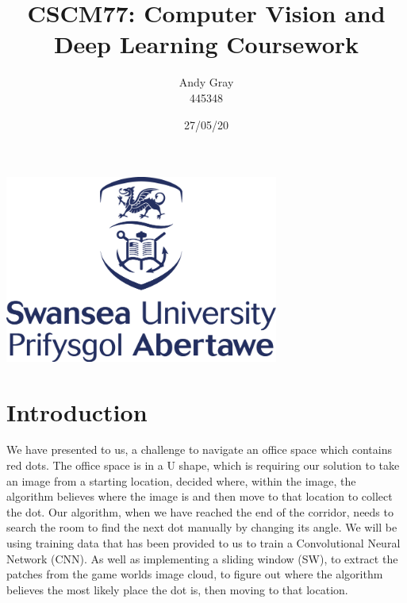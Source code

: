 \documentclass[a4paper,10pt]{article}
\begin{document}
\title{\textbf{CSCM77: Computer Vision and Deep Learning Coursework}}
\date{27/05/20}
\author{Andy Gray\\445348}




\maketitle
\begin{center}
\item\includegraphics[width=9cm]{swansea.png}
\end{center}

\thispagestyle{empty}
\newpage
{}

\section{Introduction}

\small 
We have presented to us, a challenge to navigate an office space which contains red dots. The office space is in a U shape, which is requiring our solution to take an image from a starting location, decided where, within the image, the algorithm believes where the image is and then move to that location to collect the dot. Our algorithm, when we have reached the end of the corridor, needs to search the room to find the next dot manually by changing its angle. We will be using training data that has been provided to us to train a Convolutional Neural Network (CNN). As well as implementing a sliding window (SW), to extract the patches from the game worlds image cloud, to figure out where the algorithm believes the most likely place the dot is, then moving to that location.
\end{document}

